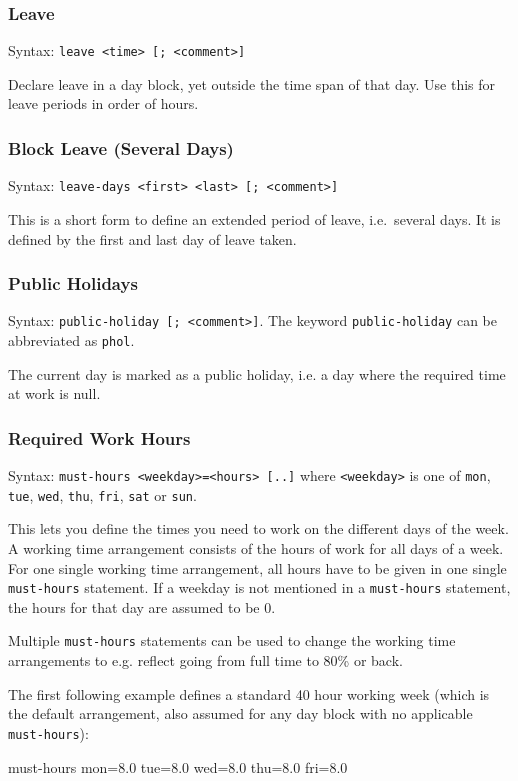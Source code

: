 \documentclass[11pt]{article}
\begin{document}
\subsubsection{Leave}

Syntax: \verb:leave <time> [; <comment>]:

Declare leave in a day block, yet outside the time span of that day. Use this for leave periods in order of hours.

\subsubsection{Block Leave (Several Days)}

Syntax: \verb:leave-days <first> <last> [; <comment>]:

This is a short form to define an extended period of leave, i.e.\ several days. It is defined by the first and last day of leave taken.

\subsubsection{Public Holidays}

Syntax: \verb:public-holiday [; <comment>]:.
The keyword \verb:public-holiday: can be abbreviated as \verb:phol:.

The current day is marked as a public holiday, i.e. a day where the required time at work is null.

\subsubsection{Required Work Hours}

Syntax: \verb:must-hours <weekday>=<hours> [..]: where \verb:<weekday>: is one of \verb:mon:, \verb:tue:, \verb:wed:, \verb:thu:, \verb:fri:, \verb:sat: or \verb:sun:.

This lets you define the times you need to work on the different days of the week. A working time arrangement consists of the hours of work for all days of a week. For one single working time arrangement, all hours have to be given in one single \verb:must-hours: statement. If a weekday is not mentioned in a \verb:must-hours: statement, the hours for that day are assumed to be 0.

Multiple \verb:must-hours: statements can be used to change the working time arrangements to e.g. reflect going from full time to 80\% or back.

The first following example defines a standard 40 hour working week (which is the default arrangement, also assumed for any day block with no applicable \verb:must-hours:):
\begin{inputfile}
must-hours mon=8.0 tue=8.0 wed=8.0 thu=8.0 fri=8.0
\end{inputfile}
\end{document}
